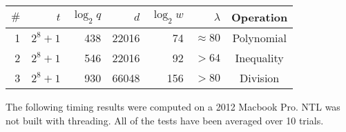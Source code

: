 \documentclass{article}
\begin{document}
        \begin{center}
            \begin{tabular}{| r | r | r | r | r | r | c |}%
                \hline
                $\#$& $t$ & $\log_2 q$ & $d$ & $\log_2w$ & $\lambda$ & Operation
                \\ \hline
                1 & $2^8 + 1$ & 438 & 22016 & 74 & $\approx 80$ & Polynomial
                \\ \hline
                2 & $2^8 + 1$ & 546 & 22016 & 92 & $>64$ & Inequality
                \\ \hline
                3 & $2^8 + 1$ & 930 & 66048 & 156 & $>80$ & Division
                \\ \hline
            \end{tabular}
        \end{center}

        The following timing results were computed on a 2012 Macbook Pro.
        NTL was not built with threading.
        All of the tests have been averaged over 10 trials.

\end{document}
